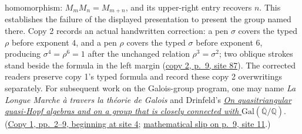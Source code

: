 homomorphism: $M_mM_n=M_{m+n}$, and its upper-right entry recovers $n$.
This establishes the
failure of the displayed presentation to present the group named there.
Copy 2 records an actual handwritten correction: a pen $\sigma$ covers
the typed $\rho$ before exponent $4$, and a pen $\rho$ covers the typed
$\sigma$ before exponent $6$, producing $\sigma^4=\rho^6=1$ after the
unchanged relation $\rho^3=\sigma^2$; two oblique strokes stand beside
the formula in the left margin
(\href{https://grothendieck.umontpellier.fr/web/viewer.html?file=../119.pdf\#page=88}{copy 2, p.~9, site 87}).
The corrected readers preserve copy 1's typed formula and record these
copy 2 overwritings separately. For subsequent work on the
Galois-group program, one may name \emph{La Longue Marche à travers la
théorie de Galois} and Drinfeld's
\href{https://www.mathnet.ru/eng/aa199}{\emph{On quasitriangular quasi-Hopf algebras and on a group that is closely connected with}
$\mathrm{Gal}(\overline{\mathbb Q}/\mathbb Q)$}.
(\href{https://grothendieck.umontpellier.fr/web/viewer.html?file=../119.pdf\#page=5}{Copy 1, pp.~2--9, beginning at site 4};
\href{https://grothendieck.umontpellier.fr/web/viewer.html?file=../119.pdf\#page=12}{mathematical slip on p.~9, site 11}.)

